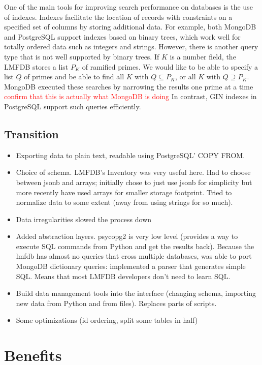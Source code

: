 \documentclass{article}
\newcommand{\todo}[1]{\textcolor{red}{#1}}
\begin{document}
One of the main tools for improving search performance on databases is the use of indexes.
Indexes facilitate the location of records with constraints on a specified set of columns by storing additional data.
For example, both MongoDB and PostgreSQL support indexes based on binary trees, which work well for totally ordered data such as integers and strings.
However, there is another query type that is not well supported by binary trees.
If $K$ is a number field, the LMFDB stores a list $P_K$ of ramified primes.
We would like to be able to specify a list $Q$ of primes and be able to find all $K$ with $Q \subseteq P_K$, or all $K$ with $Q \supseteq P_K$.
MongoDB executed these searches by narrowing the results one prime at a time \todo{confirm that this is actually what MongoDB is doing}
In contrast, GIN indexes in PostgreSQL support such queries efficiently.

\subsection{Transition}

\begin{itemize}
\item Exporting data to plain text, readable using PostgreSQL' COPY FROM.
\item Choice of schema.  LMFDB's Inventory was very useful here.  Had to choose between jsonb and arrays; initially chose to just use jsonb for simplicity but more recently have used arrays for smaller storage footprint.  Tried to normalize data to some extent (away from using strings for so much). 
\item Data irregularities slowed the process down
\item Added abstraction layers.  psycopg2 is very low level (provides a way to execute SQL commands from Python and get the results back).  Because the lmfdb has almost no queries that cross multiple databases, was able to port MongoDB dictionary queries: implemented a parser that generates simple SQL.  Means that most LMFDB developers don't need to learn SQL.
\item Build data management tools into the interface (changing schema, importing new data from Python and from files).  Replaces parts of scripts.
\item Some optimizations (id ordering, split some tables in half)
\end{itemize}

\section{Benefits}
\end{document}
